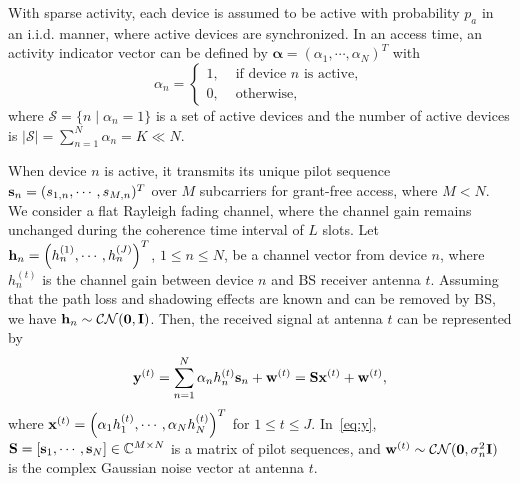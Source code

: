 \documentclass[journal]{IEEEtran}
\newcommand{\C}{\ensuremath{\mathbb C}}
\newcommand{\mS}{\mathcal{S}}
\newcommand{\hbu}{{\bf h}}
\newcommand{\sbu}{{\bf s}}
\newcommand{\xbu}{{\bf x}}
\newcommand{\ybu}{{\bf y}}
\newcommand{\wbu}{{\bf w}}
\newcommand{\Ibu}{{\bf I}}
\newcommand{\Sbu}{{\bf S}}
\newcommand{\Gbu}{{\bf G}}
\newcommand{\balp}{{\boldsymbol \alpha}}
\numberwithin{const2}{const}
\begin{document}
With sparse activity, 
each device is assumed to be active with probability $p_a$ in an i.i.d. manner,
where active devices are synchronized.
In an access time, 
an activity indicator vector can be defined by $\balp = (\alpha_1, \cdots, \alpha_N)^T$ with
\begin{equation*}\label{eq:act}
	\alpha_n = \left\{ \begin{array}{ll} 1, & \mbox{ if device } n \mbox{ is active}, \\
	0, & \mbox{ otherwise}, \end{array} \right.
\end{equation*}
where $\mS = \{ n \mid \alpha_n = 1 \}$ is a set of active devices and
the number of active devices is $|\mS| = \sum_{n=1} ^N \alpha_n = K \ll N$.

When device $n$ is active, 
it transmits its unique pilot
sequence $\sbu_n = (s_{1,n}, \cdots, s_{M,n})^T $ %
over $M$ subcarriers for grant-free access, where $M < N$.
We consider a flat Rayleigh fading channel, 
where the channel gain remains unchanged during the coherence time interval of $L$ slots.
Let $\hbu_n = \left(h_n ^{(1)}, \cdots, h_n ^{(J)} \right)^T$, $ 1 \leq n \leq N$,
be a channel vector from device $n$, 
where $h_n ^{(t)}$ is the channel gain between device $n$ and BS receiver antenna $t$.
Assuming that the path loss and shadowing effects are known and can be removed by BS,
we have $\hbu_n \sim \mathcal{CN}(\bf{0}, \Ibu) $. 
Then, the received signal at antenna $t$ can be represented %
by
\begin{equation}\label{eq:y}
	\ybu^{(t)} = \sum_{n=1} ^N \alpha_n  h_n ^{(t)} \sbu_n  + \wbu ^{(t)}
	=  \Sbu \xbu ^{(t)} + \wbu ^{(t)}, %
\end{equation}
where $\xbu ^{(t)} = \left(\alpha_1 h_1 ^{(t)}, \cdots, \alpha_N h_N ^{(t)} \right)^T$
for $ 1 \leq t \leq J$. 
In~\eqref{eq:y},
$\Sbu = [\sbu_1, \cdots, \sbu_N] \in \C^{M \times N} $ is a matrix of pilot sequences,
and $\wbu^{(t)} \sim \mathcal{CN}(\textbf{0}, \sigma_n ^2 \Ibu) $ is the complex Gaussian noise vector
at antenna $t$. 
\end{document}

